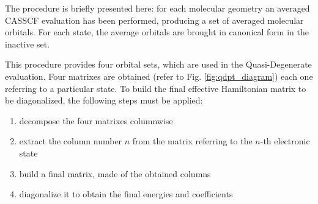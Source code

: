 The procedure is briefly presented here: for each molecular geometry an
averaged CASSCF evaluation has been performed, producing a set of averaged
molecular orbitals. For each state, the average orbitals are brought in
canonical form in the inactive set. 



This procedure provides four orbital sets, which are used in the Quasi-Degenerate evaluation. Four matrixes are obtained (refer to Fig.
\ref{fig:qdpt_diagram}) each one referring to a particular state. To build
the final effective Hamiltonian matrix to be diagonalized, the following
steps must be applied:
\begin{enumerate}
\item decompose the four matrixes columnwise
\item extract the column number $n$ from the matrix referring to the $n$-th
electronic state
\item build a final matrix, made of the obtained columns
\item diagonalize it to obtain the final energies and coefficients
\end{enumerate}



